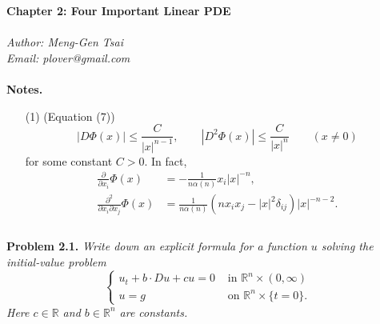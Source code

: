 \documentclass{article}
\begin{document}
\textbf{\Large Chapter 2: Four Important Linear PDE} \\\\



\emph{Author: Meng-Gen Tsai} \\
\emph{Email: plover@gmail.com} \\\\









\textbf{Notes.}
\begin{enumerate}
\item[(1)]
  (Equation (7))
  \[
    |D\Phi(x)| \leq \frac{C}{|x|^{n-1}}, \qquad
    |D^2\Phi(x)| \leq \frac{C}{|x|^{n}} \qquad (x \neq 0)
  \]
  for some constant $C > 0$.
  In fact,
  \begin{align*}
  \frac{\partial}{\partial x_i}\Phi(x)
  &= -\frac{1}{n\alpha(n)} x_i |x|^{-n}, \\
  \frac{\partial^2}{\partial x_i \partial x_j}\Phi(x)
  &= \frac{1}{n\alpha(n)} (n x_i x_j - |x|^2 \delta_{ij}) |x|^{-n-2}. \\\\
  \end{align*}

\end{enumerate}






\textbf{Problem 2.1.}
\emph{Write down an explicit formula for a function $u$ solving
the initial-value problem
\begin{equation*}
  \begin{cases}
    u_t + b \cdot Du + cu = 0 & \text{ in } \mathbb{R}^n \times (0,\infty) \\
    u                     = g & \text{ on } \mathbb{R}^n \times \{ t=0 \}.
  \end{cases}
\end{equation*}
Here $c \in \mathbb{R}$ and $b \in \mathbb{R}^n$ are constants.} \\
\end{document}
